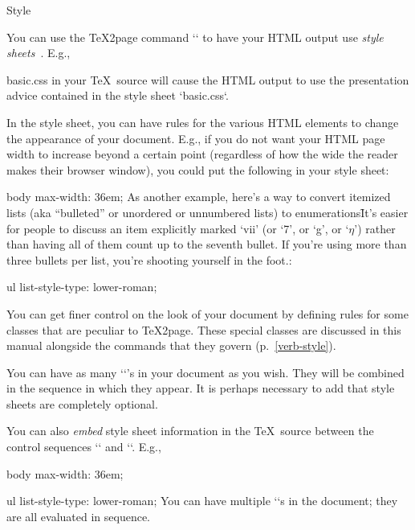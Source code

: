  Style

%
You can use the \TeX2page command `` to have your HTML output use {\em style
sheets}~\cite{w3c:css,lb:css}.  E.g.,

\begintt
\ifx\shipout\UnDeFiNeD %
   basic.css
\fi
\endtt
%
in your \TeX\ source will cause the HTML output to
use the presentation advice contained in the
style sheet `basic.css`.

In the style sheet, you can have rules for the various
HTML elements to change the appearance of your
document.  E.g., if you do not want your HTML page
width to increase beyond a certain point (regardless of
how the wide the reader makes their browser window),
you could put the following in your style sheet:

\begintt
body {
  max-width: 36em;
}
\endtt
As another example, here’s a way to convert itemized lists (aka
“bulleted” or unordered or unnumbered lists) to
enumerations\f{It’s easier for people to discuss an item
explicitly marked ‘vii’ (or ‘7’, or ‘g’, or ‘$\eta$’) rather than
having all of them count up to the seventh bullet. If you’re using
more than three bullets per list, you’re shooting yourself in the
foot.}:

\begintt
ul {
  list-style-type: lower-roman;
}
\endtt

You can get finer control on the look of your document
by defining rules for some classes that are peculiar to
\TeX2page.  These special classes
are discussed in this manual alongside the commands
that they govern (p.~\ref{verb-style}).

You can have as many ``’s in your
document as you wish.  They will be combined in
the sequence in which they appear.  It is perhaps
necessary to add that style sheets are completely
optional.


You can also {\em embed} style sheet information
in the \TeX\ source between the control sequences
`\cssblock` and `\endcssblock`.  E.g.,

\begintt
\ifx\shipout\UnDeFiNeD %
\cssblock
body {
  max-width: 36em;
}

ul {
  list-style-type: lower-roman;
}
\endcssblock
\fi
\endtt
%
You can
have multiple `\cssblock`s in the document; they
are all evaluated in sequence.


